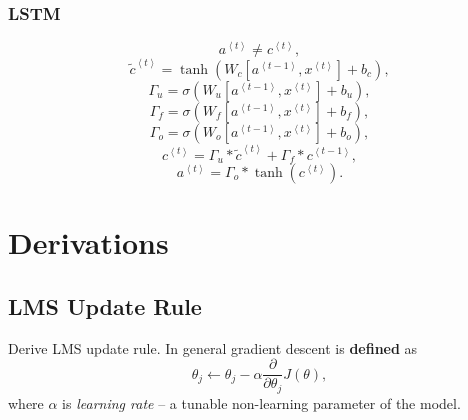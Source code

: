 \documentclass[a4paper,11pt]{article}
\begin{document}
\subsubsection{LSTM}
\begin{equation}
a^{\left\langle t \right\rangle} \neq c^{\left\langle t \right\rangle} ,
\end{equation}
\begin{equation}
\tilde{c}^{\left\langle t \right\rangle} = \tanh \left( W_c \left[ a^{\left\langle t-1 \right\rangle} , x^{\left\langle t \right\rangle} \right] + b_c \right) ,
\end{equation}
\begin{equation}
\Gamma_u = \sigma \left( W_u \left[ a^{\left\langle t-1 \right\rangle} , x^{\left\langle t \right\rangle} \right] + b_u \right) ,
\end{equation}
\begin{equation}
\Gamma_f = \sigma \left( W_f \left[ a^{\left\langle t-1 \right\rangle} , x^{\left\langle t \right\rangle} \right] + b_f \right) ,
\end{equation}
\begin{equation}
\Gamma_o = \sigma \left( W_o \left[ a^{\left\langle t-1 \right\rangle} , x^{\left\langle t \right\rangle} \right] + b_o \right) ,
\end{equation}
\begin{equation}
c^{\left\langle t \right\rangle} = \Gamma_u \ast \tilde{c}^{\left\langle t \right\rangle} + \Gamma_f \ast c^{\left\langle t-1 \right\rangle} ,
\end{equation}
\begin{equation}
a^{\left\langle t \right\rangle} = \Gamma_o \ast \tanh \left(c^{\left\langle t \right\rangle} \right) .
\end{equation}

\section{Derivations}
\subsection{LMS Update Rule}
Derive LMS update rule. In general gradient descent is \textbf{defined} as
\begin{equation}
\theta_j \leftarrow \theta_j - \alpha \frac{\partial}{\partial \theta_j} J \left( \theta \right) ,
\end{equation}
where \textcolor{OliveGreen}{$\alpha$} is \textit{learning rate} -- a tunable non-learning parameter of the model.
\end{document}
